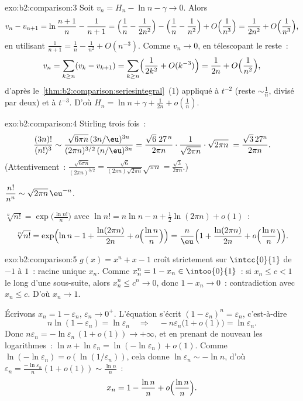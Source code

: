 \begin{solution}{exo:b2:comparison:3}
Soit $v_n = H_n - \ln n - \gamma \to 0$. Alors
\[
v_n - v_{n+1} = \ln\frac{n+1}{n} - \frac{1}{n+1}
= \Bigl(\frac1n - \frac{1}{2n^2}\Bigr) - \Bigl(\frac1n -
\frac{1}{n^2}\Bigr) + O\Bigl(\frac{1}{n^3}\Bigr)
= \frac{1}{2n^2} + O\Bigl(\frac{1}{n^3}\Bigr),
\]
en utilisant $\frac{1}{n+1} = \frac1n - \frac{1}{n^2} + O(n^{-3})$.
Comme $v_n \to 0$, en télescopant le reste~:
\[
v_n = \sum_{k \geq n} (v_k - v_{k+1})
= \sum_{k\geq n} \Bigl(\frac{1}{2k^2} + O(k^{-3})\Bigr)
= \frac{1}{2n} + O\Bigl(\frac{1}{n^2}\Bigr),
\]
d'après le~\cref{thm:b2:comparison:seriesintegral}~(1) appliqué à
$t^{-2}$ (reste $\sim \frac1n$, divisé par deux) et à $t^{-3}$. D'où
$H_n = \ln n + \gamma + \frac{1}{2n} + o(\frac1n)$.
\end{solution}

\begin{solution}{exo:b2:comparison:4}
Stirling trois fois~:
\[
\frac{(3n)!}{(n!)^3}
\sim \frac{\sqrt{6\pi n}\,(3n/\eu)^{3n}}
{(2\pi n)^{3/2}\,(n/\eu)^{3n}}
= \frac{\sqrt{6}\; 27^{\,n}}{2\pi n} \cdot
\frac{1}{\sqrt{2\pi n}}\cdot\sqrt{2\pi n}\;
= \frac{\sqrt3\,27^n}{2\pi n} .
\]
(Attentivement~: $\frac{\sqrt{6\pi n}}{(2\pi n)^{3/2}} =
\frac{\sqrt6}{(2\pi n)\sqrt{2\pi n}}\sqrt{\pi n} =
\frac{\sqrt3}{2\pi n}$.)

$\dfrac{n!}{n^n} \sim \sqrt{2\pi n}\,\eu^{-n}$.

$\sqrt[n]{n!} = \exp\bigl(\frac{\ln n!}{n}\bigr)$ avec $\ln n! = n\ln
n - n + \frac12\ln(2\pi n) + o(1)$~:
\[
\sqrt[n]{n!} = \exp\Bigl(\ln n - 1 + \frac{\ln(2\pi n)}{2n} +
o\Bigl(\frac{\ln n}{n}\Bigr)\Bigr)
= \frac{n}{\eu}\Bigl(1 + \frac{\ln(2\pi n)}{2n} +
o\Bigl(\frac{\ln n}{n}\Bigr)\Bigr).
\]
\end{solution}

\begin{solution}{exo:b2:comparison:5}
$g(x) = x^n + x - 1$ croît strictement sur $\intcc{0}{1}$ de $-1$
à $1$~: racine unique $x_n$. Comme $x_n^n = 1 - x_n \in
\intoo{0}{1}$~: si $x_n \leq c < 1$ le long d'une sous-suite, alors
$x_n^n \leq c^n \to 0$, donc $1 - x_n \to 0$~: contradiction avec $x_n
\leq c$. D'où $x_n \to 1$.

Écrivons $x_n = 1 - \varepsilon_n$, $\varepsilon_n \to 0^+$.
L'équation s'écrit $(1 - \varepsilon_n)^n = \varepsilon_n$,
c'est-à-dire
\[
n\ln(1 - \varepsilon_n) = \ln \varepsilon_n
\quad\Longrightarrow\quad
-n\varepsilon_n\bigl(1 + o(1)\bigr) = \ln\varepsilon_n .
\]
Donc $n\varepsilon_n = -\ln\varepsilon_n\,(1 + o(1)) \to +\infty$, et
en prenant de nouveau les logarithmes~: $\ln n + \ln\varepsilon_n =
\ln(-\ln\varepsilon_n) + o(1)$. Comme $\ln(-\ln \varepsilon_n) =
o(\ln(1/\varepsilon_n))$, cela donne $\ln\varepsilon_n \sim -\ln
n$, d'où $\varepsilon_n = \frac{-\ln\varepsilon_n}{n}(1 + o(1))
\sim \frac{\ln n}{n}$~:
\[
x_n = 1 - \frac{\ln n}{n} + o\Bigl(\frac{\ln n}{n}\Bigr) .
\]
\end{solution}


